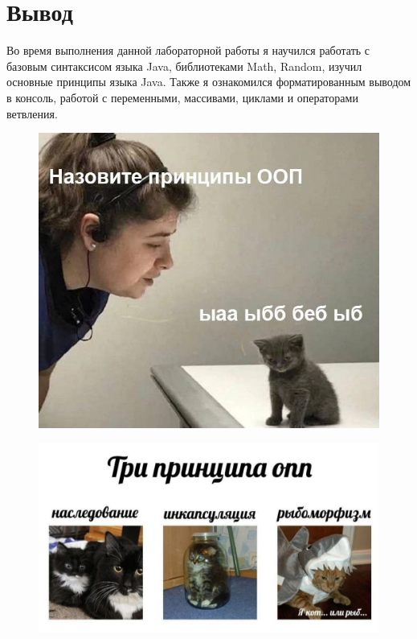 \section{Вывод}
Во время выполнения данной лабораторной работы я научился работать с базовым синтаксисом языка Java,
библиотеками Math, Random, изучил основные принципы языка Java.
Также я ознакомился форматированным выводом в консоль, работой с переменными, массивами, циклами и операторами ветвления.

\begin{figure}[ht]
    \centering
    \includegraphics[scale=0.3]{img/meme1.jpg}
\end{figure}
\begin{figure}[ht]
    \centering
    \includegraphics[scale=0.3]{img/meme2.jpg}
\end{figure}